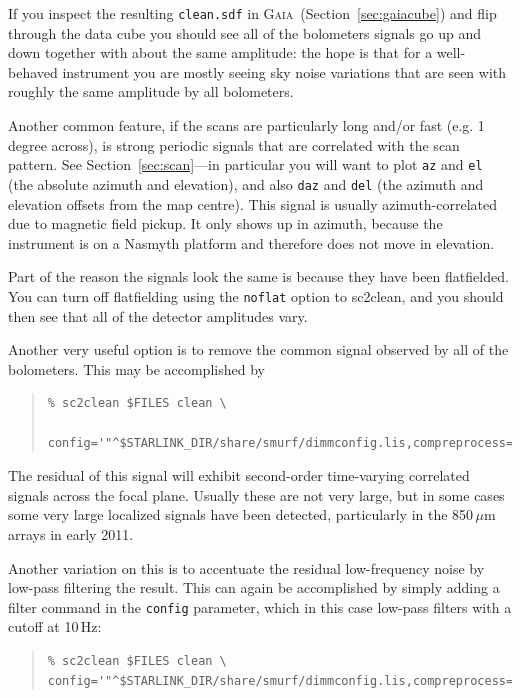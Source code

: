 \documentclass[twoside,11pt]{article}
\newcommand{\htmlref}[2]{#1}
\newcommand{\latexhtml}[2]{#1}
\newcommand{\xref}[3]{#1}
\renewcommand{\_}{\texttt{\symbol{95}}}
\newenvironment{myquote}{\begin{quote}\begin{small}}{\end{small}\end{quote}}
\newcommand{\gaia}{\xref{\textsc{Gaia}}{sun214}{}}
\newcommand{\task}[1]{\textsf{#1}}
\newcommand{\cref}[3]{\latexhtml{#1~\ref{#2}}{\htmlref{#3}{#2}}}
\begin{document}
If you inspect the resulting \texttt{clean.sdf} in \gaia\
(\cref{Section}{sec:gaiacube}{Displaying time-series data}) and flip
through the data cube you should
see all of the bolometers signals go up and down together with about
the same amplitude: the hope is that for a well-behaved instrument you
are mostly seeing sky noise variations that are seen with roughly the
same amplitude by all bolometers.

Another common feature, if the scans are particularly long and/or fast
(e.g. 1\,degree across), is strong periodic signals that are correlated
with the scan pattern. See \cref{Section}{sec:scan}{Displaying scan
patterns}---in particular
you will want to plot \texttt{az} and \texttt{el} (the absolute
azimuth and elevation), and also \texttt{daz} and \texttt{del} (the
azimuth and elevation offsets from the map centre). This signal is
usually azimuth-correlated due to magnetic field pickup. It only shows
up in azimuth, because the instrument is on a Nasmyth platform and
therefore does not move in elevation.

Part of the reason the signals look the same is because they have been
flatfielded. You can turn off flatfielding using the \texttt{noflat}
option to \task{sc2clean}, and you should then see that all of the detector
amplitudes vary.

Another very useful option is to remove the common signal observed by
all of the bolometers. This may be accomplished by

\begin{myquote}
\begin{verbatim}
% sc2clean $FILES clean \
   config='"^$STARLINK_DIR/share/smurf/dimmconfig.lis,compreprocess=1"'
\end{verbatim}
\end{myquote}

The residual of this signal will exhibit second-order time-varying
correlated signals across the focal plane. Usually these are not very
large, but in some cases some very large localized signals have been
detected, particularly in the 850\,$\mu$m arrays in early 2011.

Another variation on this is to accentuate the residual low-frequency
noise by low-pass filtering the result. This can again be accomplished
by simply adding a filter command in the \texttt{config} parameter,
which in this case low-pass filters with a cutoff at 10\,Hz:

\begin{myquote}
\begin{verbatim}
% sc2clean $FILES clean \
config='"^$STARLINK_DIR/share/smurf/dimmconfig.lis,compreprocess=1,filt_edgelow=10"'
\end{verbatim}
\end{myquote}
\end{document}

